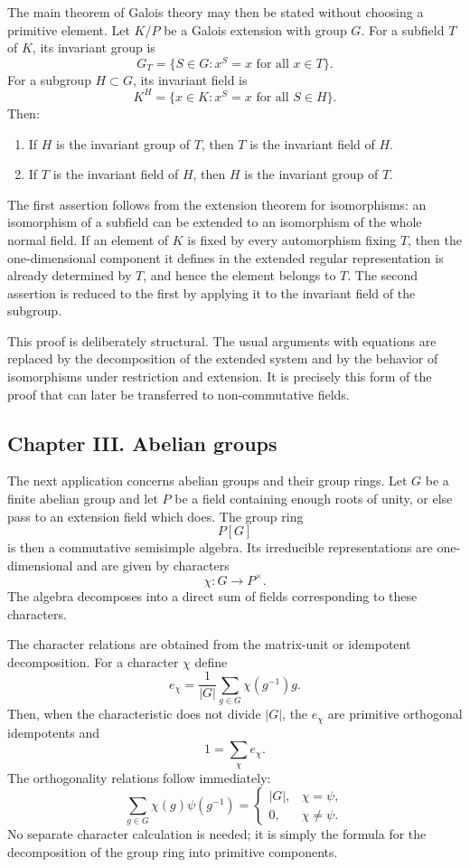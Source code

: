 \documentclass[12pt]{article}
\begin{document}
The main theorem of Galois theory may then be stated without choosing a primitive element. Let \(K/P\) be a Galois extension with group \(G\). For a subfield \(T\) of \(K\), its invariant group is
\[
  G_T=\{S\in G: x^S=x\text{ for all }x\in T\}.
\]
For a subgroup \(H\subset G\), its invariant field is
\[
  K^H=\{x\in K: x^S=x\text{ for all }S\in H\}.
\]
Then:
\begin{enumerate}[label=\arabic*.]
\item If \(H\) is the invariant group of \(T\), then \(T\) is the invariant field of \(H\).
\item If \(T\) is the invariant field of \(H\), then \(H\) is the invariant group of \(T\).
\end{enumerate}
The first assertion follows from the extension theorem for isomorphisms: an isomorphism of a subfield can be extended to an isomorphism of the whole normal field. If an element of \(K\) is fixed by every automorphism fixing \(T\), then the one-dimensional component it defines in the extended regular representation is already determined by \(T\), and hence the element belongs to \(T\). The second assertion is reduced to the first by applying it to the invariant field of the subgroup.

This proof is deliberately structural. The usual arguments with equations are replaced by the decomposition of the extended system and by the behavior of isomorphisms under restriction and extension. It is precisely this form of the proof that can later be transferred to non-commutative fields.

\subsection{Chapter III. Abelian groups}

The next application concerns abelian groups and their group rings. Let \(G\) be a finite abelian group and let \(P\) be a field containing enough roots of unity, or else pass to an extension field which does. The group ring
\[
  P[G]
\]
is then a commutative semisimple algebra. Its irreducible representations are one-dimensional and are given by characters
\[
  \chi:G\longrightarrow P^{\times}.
\]
The algebra decomposes into a direct sum of fields corresponding to these characters.

The character relations are obtained from the matrix-unit or idempotent decomposition. For a character \(\chi\) define
\[
  e_\chi=\frac1{|G|}\sum_{g\in G}\chi(g^{-1})g.
\]
Then, when the characteristic does not divide \(|G|\), the \(e_\chi\) are primitive orthogonal idempotents and
\[
  1=\sum_\chi e_\chi.
\]
The orthogonality relations follow immediately:
\[
  \sum_{g\in G}\chi(g)\psi(g^{-1})=
  \begin{cases}
  |G|,&\chi=\psi,\\
  0,&\chi\ne\psi.
  \end{cases}
\]
No separate character calculation is needed; it is simply the formula for the decomposition of the group ring into primitive components.
\end{document}
